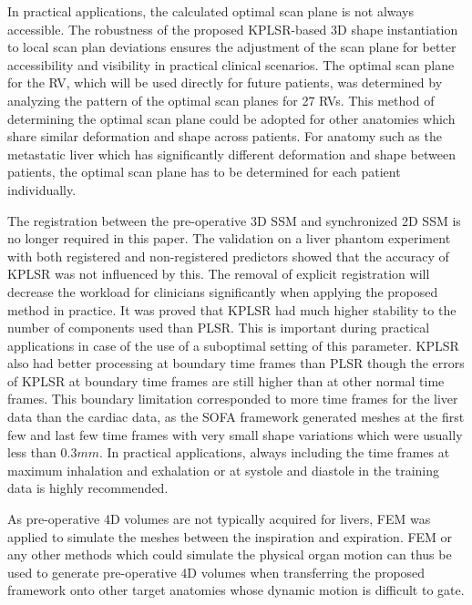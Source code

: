 \documentclass[review]{elsarticle}
\begin{document}
In practical applications, the calculated optimal scan plane is not always accessible. The robustness of the proposed KPLSR-based 3D shape instantiation to local scan plan deviations ensures the adjustment of the scan plane for better accessibility and visibility in practical clinical scenarios. The optimal scan plane for the RV, which will be used directly for future patients, was determined by analyzing the pattern of the optimal scan planes for 27 RVs. This method of determining the optimal scan plane could be adopted for other anatomies which share similar deformation and shape across patients. For anatomy such as the metastatic liver which has significantly different deformation and shape between patients, the optimal scan plane has to be determined for each patient individually.

The registration between the pre-operative 3D SSM and synchronized 2D SSM is no longer required in this paper. The validation on a liver phantom experiment with both registered and non-registered predictors showed that the accuracy of KPLSR was not influenced by this. The removal of explicit registration will decrease the workload for clinicians significantly when applying the proposed method in practice. It was proved that KPLSR had much higher stability to the number of components used than PLSR. This is important during practical applications in case of the use of a suboptimal setting of this parameter. KPLSR also had better processing at boundary time frames than PLSR though the errors of KPLSR at boundary time frames are still higher than at other normal time frames. This boundary limitation corresponded to more time frames for the liver data than the cardiac data, as the SOFA framework generated meshes at the first few and last few time frames with very small shape variations which were usually less than $0.3mm$. In practical applications, always including the time frames at maximum inhalation and exhalation or at systole and diastole in the training data is highly recommended.

As pre-operative 4D volumes are not typically acquired for livers, FEM was applied to simulate the meshes between the inspiration and expiration. FEM or any other methods which could simulate the physical organ motion can thus be used to generate pre-operative 4D volumes when transferring the proposed framework onto other target anatomies whose dynamic motion is difficult to gate.
\end{document}
